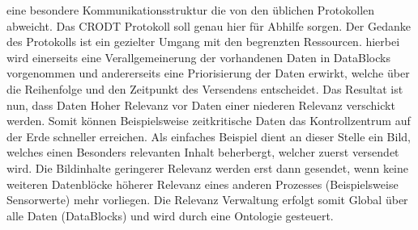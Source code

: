 eine besondere Kommunikationsstruktur die von den {\"u}blichen Protokollen 
abweicht. Das CRODT Protokoll soll genau hier f{\"u}r Abhilfe sorgen. 
Der Gedanke des Protokolls ist ein gezielter Umgang mit den begrenzten 
Ressourcen. hierbei wird einerseits eine Verallgemeinerung der vorhandenen 
Daten in DataBlocks vorgenommen und andererseits eine Priorisierung der 
Daten erwirkt, welche {\"u}ber die Reihenfolge und den Zeitpunkt des 
Versendens entscheidet. Das Resultat ist nun, dass Daten Hoher Relevanz 
vor Daten einer niederen Relevanz verschickt werden. Somit k{\"o}nnen 
Beispielsweise zeitkritische Daten das Kontrollzentrum auf der Erde 
schneller erreichen. Als einfaches Beispiel dient an dieser Stelle ein 
Bild, welches einen Besonders relevanten Inhalt beherbergt, welcher 
zuerst versendet wird. Die Bildinhalte geringerer Relevanz werden erst 
dann gesendet, wenn keine weiteren Datenbl{\"o}cke h{\"o}herer Relevanz 
eines anderen Prozesses (Beispielsweise Sensorwerte) mehr vorliegen. Die 
Relevanz Verwaltung erfolgt somit Global {\"u}ber alle Daten (DataBlocks) 
und wird durch eine Ontologie gesteuert.
